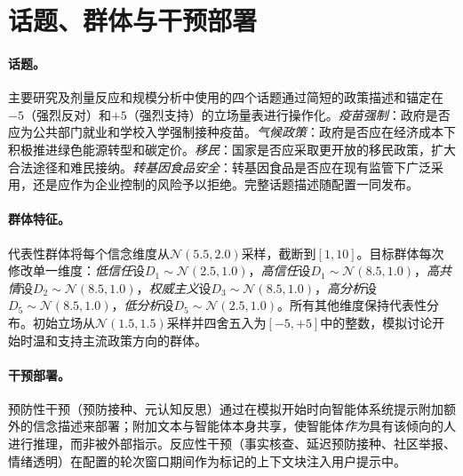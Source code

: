 \section{话题、群体与干预部署}
\label{app:impl}

\paragraph{话题。}
主要研究及剂量反应和规模分析中使用的四个话题通过简短的政策描述和锚定在$-5$（强烈反对）和$+5$（强烈支持）的立场量表进行操作化。\emph{疫苗强制}：政府是否应为公共部门就业和学校入学强制接种疫苗。\emph{气候政策}：政府是否应在经济成本下积极推进绿色能源转型和碳定价。\emph{移民}：国家是否应采取更开放的移民政策，扩大合法途径和难民接纳。\emph{转基因食品安全}：转基因食品是否应在现有监管下广泛采用，还是应作为企业控制的风险予以拒绝。完整话题描述随配置一同发布。

\paragraph{群体特征。}
代表性群体将每个信念维度从$\mathcal{N}(5.5, 2.0)$采样，截断到$[1, 10]$。目标群体每次修改单一维度：\emph{低信任}设$D_1 \sim \mathcal{N}(2.5, 1.0)$，\emph{高信任}设$D_1 \sim \mathcal{N}(8.5, 1.0)$，\emph{高共情}设$D_2 \sim \mathcal{N}(8.5, 1.0)$，\emph{权威主义}设$D_3 \sim \mathcal{N}(8.5, 1.0)$，\emph{高分析}设$D_5 \sim \mathcal{N}(8.5, 1.0)$，\emph{低分析}设$D_5 \sim \mathcal{N}(2.5, 1.0)$。所有其他维度保持代表性分布。初始立场从$\mathcal{N}(1.5, 1.5)$采样并四舍五入为$[-5, +5]$中的整数，模拟讨论开始时温和支持主流政策方向的群体。

\paragraph{干预部署。}
预防性干预（预防接种、元认知反思）通过在模拟开始时向智能体系统提示附加额外的信念描述来部署；附加文本与智能体本身共享，使智能体\emph{作为}具有该倾向的人进行推理，而非被外部指示。反应性干预（事实核查、延迟预防接种、社区举报、情绪透明）在配置的轮次窗口期间作为标记的上下文块注入用户提示中。
